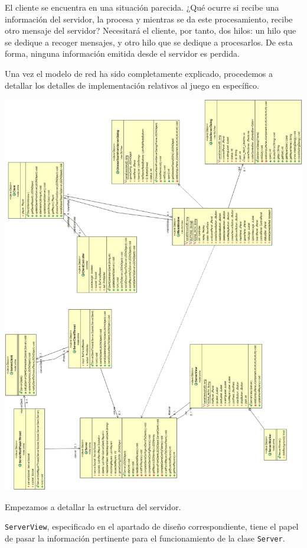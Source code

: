\documentclass[../DocumentoOficial.tex]{subfiles}
\begin{document}
El cliente se encuentra en una situación parecida. ¿Qué ocurre si recibe una información del servidor, la procesa y mientras se da este procesamiento, recibe otro mensaje del servidor? Necesitará el cliente, por tanto, dos hilos: un hilo que se dedique a recoger mensajes, y otro hilo que se dedique a procesarlos. De esta forma, ninguna información emitida desde el servidor es perdida.

Una vez el modelo de red ha sido completamente explicado, procedemos a detallar los detalles de implementación relativos al juego en específico.

\begin{center}
\includegraphics[scale=0.45]{UMLClasesRedSprint7.png} 
\end{center}

Empezamos a detallar la estructura del servidor.

\texttt{ServerView}, especificado en el apartado de diseño correspondiente, tiene el papel de pasar la información pertinente para el funcionamiento de la clase \texttt{Server}.
\end{document}
